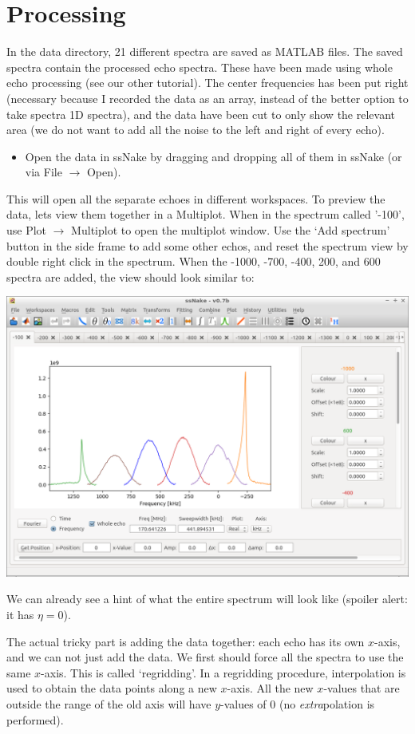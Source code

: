 \documentclass[11pt,a4paper]{article}
\begin{document}
\section{Processing}
In the data directory, 21 different spectra are saved as MATLAB files. The saved spectra contain the
processed echo spectra. These have been made using whole echo processing (see our other tutorial).
The center frequencies has been put right (necessary because I recorded the data as an array,
instead of the better option to take spectra 1D spectra), and the data have been cut to only show
the relevant area (we do not want to add all the noise to the left and right of every echo).

\begin{itemize}
\item Open the data in ssNake by dragging and dropping all of them in ssNake (or via File $\longrightarrow$ Open).
\end{itemize}
This will open all the separate echoes in different workspaces.
To preview the data, lets view them together in a Multiplot.
When in the spectrum called '-100', use Plot $\longrightarrow$ Multiplot to open the multiplot window.
Use the `Add spectrum' button in the side frame to add some other echos, and reset the spectrum view by double right click in the spectrum.
When the -1000, -700, -400, 200, and 600 spectra are added, the view should look similar to:

\begin{center}
\includegraphics[width=0.8\linewidth]{Figs/Fig1.png}
\end{center}

We can already see a hint of what the entire spectrum will look like (spoiler alert: it has $\eta=0$).

The actual tricky part is adding the data together: each echo has its own $x$-axis, and we can not just add the data.
We first should force all the spectra to use the same $x$-axis.
This is called `regridding'.
In a regridding procedure, interpolation is used to obtain the data points along a new $x$-axis.
All the new $x$-values that are outside the range of the old axis will have $y$-values of 0 (no \textit{extra}polation is performed).
\end{document}
